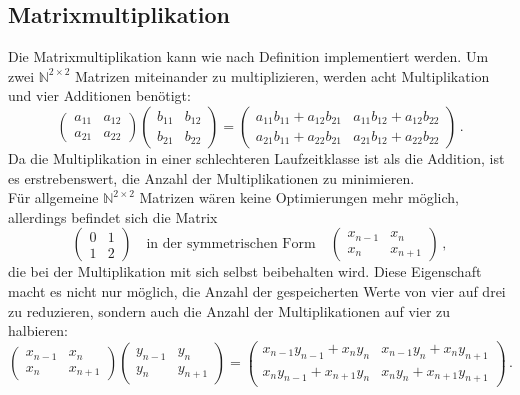 \documentclass[course=erap]{aspdoc}
\begin{document}
\subsection{Matrixmultiplikation}
Die Matrixmultiplikation kann wie nach Definition implementiert werden. Um zwei $\mathbb{N}^{2\times2}$ Matrizen miteinander zu multiplizieren, werden acht Multiplikation und vier Additionen benötigt:
\[
\left(\begin{matrix}
      a_{11} & a_{12}\\
      a_{21} & a_{22}
      \end{matrix}\right)
\left(\begin{matrix}
      b_{11} & b_{12}\\
      b_{21} & b_{22}
      \end{matrix}\right)
=
\left(\begin{matrix}
      a_{11}b_{11}+a_{12}b_{21} & a_{11}b_{12}+a_{12}b_{22}\\
      a_{21}b_{11}+a_{22}b_{21} & a_{21}b_{12}+a_{22}b_{22}
      \end{matrix}\right) \, .
\]
Da die Multiplikation in einer schlechteren Laufzeitklasse ist als die Addition, ist es erstrebenswert, die Anzahl der Multiplikationen zu minimieren. \\
Für allgemeine $\mathbb{N}^{2\times2}$ Matrizen wären keine Optimierungen mehr möglich, allerdings befindet sich die Matrix
\begin{equation*}
  \left(\begin{matrix}
      0 & 1 \\
      1 & 2
  \end{matrix}\right) \quad \text{in der symmetrischen Form} \quad
  \left(\begin{matrix}
      x_{n-1} & x_n \\
      x_n     & x_{n+1}
  \end{matrix}\right) \, ,
\end{equation*}
die bei der Multiplikation mit sich selbst beibehalten wird.
Diese Eigenschaft macht es nicht nur möglich, die Anzahl der gespeicherten Werte von vier auf drei zu reduzieren, sondern auch die Anzahl der Multiplikationen auf vier zu halbieren:
\[
\left(\begin{matrix}
      x_{n-1} & x_n\\
      x_n & x_{n+1}
      \end{matrix}\right)
\left(\begin{matrix}
      y_{n-1} & y_n\\
      y_n & y_{n+1}
      \end{matrix}\right)
=
\left(\begin{matrix}
      x_{n-1}y_{n-1}+x_ny_n & x_{n-1}y_n+x_ny_{n+1}\\
      x_ny_{n-1}+x_{n+1}y_n & x_ny_n+x_{n+1}y_{n+1}
      \end{matrix}\right) \, .
\]
\end{document}
